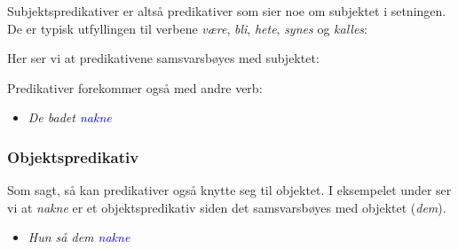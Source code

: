 \documentclass{article}
\begin{document}
Subjektspredikativer er alts{\aa} predikativer som sier noe om subjektet i setningen. De er typisk utfyllingen til verbene {\it v{\ae}re}, {\it bli}, {\it hete}, {\it synes} og {\it kalles}:

\begin{exe}
\ex
\begin{xlist}




\end{xlist}
\end{exe}


Her ser vi at predikativene samsvarsb{\o}yes med subjektet:
\begin{exe}
\ex
\begin{xlist}




\end{xlist}
\end{exe}


Predikativer forekommer ogs{\aa} med andre verb:
\begin{itemize}
\item {\it De badet \textcolor{blue}{nakne}}
\end{itemize}


\subsubsection{Objektspredikativ}

Som sagt, s{\aa} kan predikativer ogs{\aa} knytte seg til objektet. I eksempelet under ser vi at {\it nakne} er et objektspredikativ siden det samsvarsb{\o}yes  med objektet ({\it dem}).

\begin{itemize}
\item {\it Hun s{\aa} dem \textcolor{blue}{nakne}}
\end{itemize}
\end{document}
